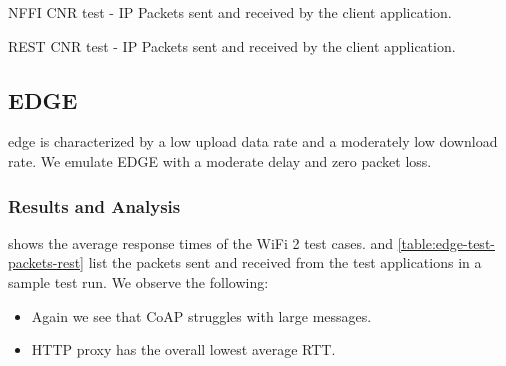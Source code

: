 \begin{table}[h]

\caption{NFFI CNR test - IP Packets sent and received by the client application.}
\label{table:cnr-test-packets-nffi}
\end{table}

\begin{table}[h]

\caption{REST CNR test - IP Packets sent and received by the client application.}
\label{table:cnr-test-packets-rest}
\end{table}


\subsection{EDGE}

\gls{edge} is characterized by a low upload data rate and a moderately low
download rate. We emulate EDGE with a moderate delay and zero packet loss.

\subsubsection{Results and Analysis}

 shows the average response times of the WiFi 2 test
cases.  and
\cref{table:edge-test-packets-rest} list the packets sent and received from the
test applications in a sample test run. We observe the following:

\begin{itemize}

    \item Again we see that CoAP struggles with large messages.

    \item HTTP proxy has the overall lowest average RTT.

\end{itemize}


